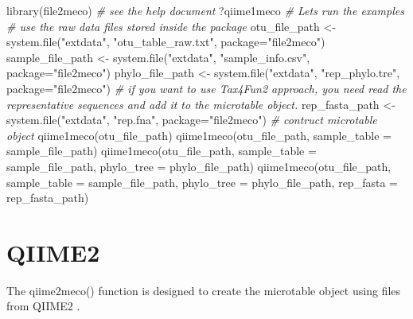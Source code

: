 \documentclass[
]{book}
\newenvironment{Shaded}{\begin{snugshade}}{\end{snugshade}}
\newcommand{\AttributeTok}[1]{\textcolor[rgb]{0.77,0.63,0.00}{#1}}
\newcommand{\CommentTok}[1]{\textcolor[rgb]{0.56,0.35,0.01}{\textit{#1}}}
\newcommand{\FunctionTok}[1]{\textcolor[rgb]{0.00,0.00,0.00}{#1}}
\newcommand{\NormalTok}[1]{#1}
\newcommand{\OtherTok}[1]{\textcolor[rgb]{0.56,0.35,0.01}{#1}}
\newcommand{\StringTok}[1]{\textcolor[rgb]{0.31,0.60,0.02}{#1}}
\begin{document}
\begin{Shaded}
\begin{Highlighting}[]
\FunctionTok{library}\NormalTok{(file2meco)}
\CommentTok{\# see the help document}
\NormalTok{?qiime1meco}
\CommentTok{\# Let\textquotesingle{}s run the examples}
\CommentTok{\# use the raw data files stored inside the package}
\NormalTok{otu\_file\_path }\OtherTok{\textless{}{-}} \FunctionTok{system.file}\NormalTok{(}\StringTok{"extdata"}\NormalTok{, }\StringTok{"otu\_table\_raw.txt"}\NormalTok{, }\AttributeTok{package=}\StringTok{"file2meco"}\NormalTok{)}
\NormalTok{sample\_file\_path }\OtherTok{\textless{}{-}} \FunctionTok{system.file}\NormalTok{(}\StringTok{"extdata"}\NormalTok{, }\StringTok{"sample\_info.csv"}\NormalTok{, }\AttributeTok{package=}\StringTok{"file2meco"}\NormalTok{)}
\NormalTok{phylo\_file\_path }\OtherTok{\textless{}{-}} \FunctionTok{system.file}\NormalTok{(}\StringTok{"extdata"}\NormalTok{, }\StringTok{"rep\_phylo.tre"}\NormalTok{, }\AttributeTok{package=}\StringTok{"file2meco"}\NormalTok{)}
\CommentTok{\# if you want to use Tax4Fun2 approach, you need read the representative sequences and add it to the microtable object.}
\NormalTok{rep\_fasta\_path }\OtherTok{\textless{}{-}} \FunctionTok{system.file}\NormalTok{(}\StringTok{"extdata"}\NormalTok{, }\StringTok{"rep.fna"}\NormalTok{, }\AttributeTok{package=}\StringTok{"file2meco"}\NormalTok{)}
\CommentTok{\# contruct microtable object}
\FunctionTok{qiime1meco}\NormalTok{(otu\_file\_path)}
\FunctionTok{qiime1meco}\NormalTok{(otu\_file\_path, }\AttributeTok{sample\_table =}\NormalTok{ sample\_file\_path)}
\FunctionTok{qiime1meco}\NormalTok{(otu\_file\_path, }\AttributeTok{sample\_table =}\NormalTok{ sample\_file\_path, }\AttributeTok{phylo\_tree =}\NormalTok{ phylo\_file\_path)}
\FunctionTok{qiime1meco}\NormalTok{(otu\_file\_path, }\AttributeTok{sample\_table =}\NormalTok{ sample\_file\_path, }\AttributeTok{phylo\_tree =}\NormalTok{ phylo\_file\_path, }\AttributeTok{rep\_fasta =}\NormalTok{ rep\_fasta\_path)}
\end{Highlighting}
\end{Shaded}

\hypertarget{qiime2}{%
\section{QIIME2}\label{qiime2}}

The qiime2meco() function is designed to create the microtable object using files from QIIME2 \citep{Bolyen_Reproducible_2019}.
\end{document}
